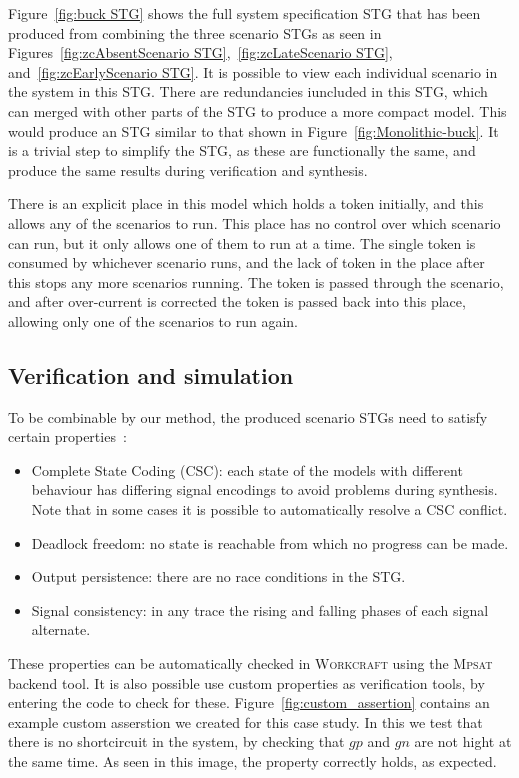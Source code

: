 \documentclass[british,compsoc]{IEEEtran}
\newcommand{\noun}[1]{\textsc{#1}}
\begin{document}
Figure~\ref{fig:buck STG} shows the full system specification STG
that has been produced from combining the three scenario STGs as seen
in Figures~\ref{fig:zcAbsentScenario STG},~\ref{fig:zcLateScenario STG},
and~\ref{fig:zcEarlyScenario STG}. It is possible to view each individual
scenario in the system in this STG. There are redundancies iuncluded in
this STG, which can merged with other parts of the STG
to produce a more compact model. This would produce an STG
similar to that shown in Figure~\ref{fig:Monolithic-buck}.  It is a trivial
step to simplify the STG, as these are functionally the same, and
produce the same results during verification and synthesis.

There is an explicit place in this model which holds a token initially,
and this allows any of the scenarios to run. This place has no
control over which scenario can run, but it only allows one of
them to run at a time. The single token is consumed
by whichever scenario runs, and the lack of token in the place
after this stops any more scenarios running. The token is passed through
the scenario, and after over-current is corrected the token is passed
back into this place, allowing only one of the scenarios to run again.


\subsection{Verification and simulation}


To be combinable by our method, the produced scenario STGs need to satisfy certain
properties~\cite{Cortadella}:
\begin{itemize}
\item Complete State Coding (CSC): each state of the models with different
behaviour has differing signal encodings to avoid problems during
synthesis. Note that in some cases it is possible to automatically
resolve a CSC conflict.
\item Deadlock freedom: no state is reachable from which no progress can
be made.
\item Output persistence: there are no race conditions in the STG.
\item Signal consistency: in any trace the rising and falling phases of
each signal alternate.
\end{itemize}
These properties can be automatically checked in \noun{Workcraft} using
the \noun{Mpsat}~\cite{khomenko2004detecting} backend tool.
It is also possible use custom properties as verification tools, by entering the code to check for these.
Figure~\ref{fig:custom_assertion} contains an example custom asserstion we created for this case study.
In this we test that there is no shortcircuit in the system, by checking that $gp$ and $gn$ are not hight at the same time.
As seen in this image, the property correctly holds, as expected.
\end{document}
